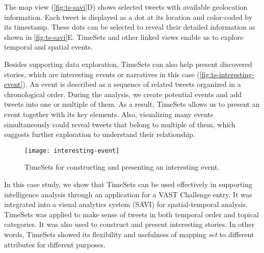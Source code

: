 The map view (\autoref{fig:ts-savi}D) shows selected tweets with available geolocation information. Each tweet is displayed as a dot at its location and color-coded by its timestamp. These dots can be selected to reveal their detailed information as shown in \autoref{fig:ts-savi}E. TimeSets and other linked views enable us to explore temporal and spatial events.

Besides supporting data exploration, TimeSets can also help present discovered stories, which are interesting events or narratives in this case (\autoref{fig:ts-interesting-event}). An event is described as a sequence of related tweets organized in a chronological order. During the analysis, we create potential events and add tweets into one or multiple of them. As a result, TimeSets allows us to present an event together with its key elements. Also, visualizing many events simultaneously could reveal tweets that belong to multiple of them, which suggests further exploration to understand their relationship.

\begin{figure}
	\centering
	\texttt{[image: interesting-event]}
	\caption{TimeSets for constructing and presenting an interesting event.}
	\label{fig:ts-interesting-event}
\end{figure}

In this case study, we show that TimeSets can be used effectively in supporting intelligence analysis through an application for a VAST Challenge entry. It was integrated into a visual analytics system (SAVI) for spatial-temporal analysis. TimeSets was applied to make sense of tweets in both temporal order and topical categories. It was also used to construct and present interesting stories. In other words, TimeSets showed its flexibility and usefulness of  mapping \emph{set} to different attributes for different purposes.